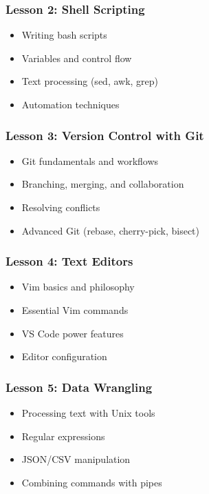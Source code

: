 \documentclass[11pt,letterpaper]{article}
\begin{document}
\subsubsection{Lesson 2: Shell Scripting}
\begin{itemize}[leftmargin=*]
    \item Writing bash scripts
    \item Variables and control flow
    \item Text processing (sed, awk, grep)
    \item Automation techniques
\end{itemize}

\subsubsection{Lesson 3: Version Control with Git}
\begin{itemize}[leftmargin=*]
    \item Git fundamentals and workflows
    \item Branching, merging, and collaboration
    \item Resolving conflicts
    \item Advanced Git (rebase, cherry-pick, bisect)
\end{itemize}

\subsubsection{Lesson 4: Text Editors}
\begin{itemize}[leftmargin=*]
    \item Vim basics and philosophy
    \item Essential Vim commands
    \item VS Code power features
    \item Editor configuration
\end{itemize}

\subsubsection{Lesson 5: Data Wrangling}
\begin{itemize}[leftmargin=*]
    \item Processing text with Unix tools
    \item Regular expressions
    \item JSON/CSV manipulation
    \item Combining commands with pipes
\end{itemize}
\end{document}

